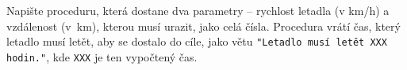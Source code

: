 \question[30]
Napište proceduru, která dostane dva parametry -- rychlost letadla (v km/h) a
vzdálenost (v~km), kterou musí urazit, jako celá čísla. Procedura vrátí čas,
který letadlo musí letět, aby se dostalo do cíle, jako větu \texttt{"Letadlo
musí letět XXX hodin."}, kde \texttt{XXX} je ten vypočtený čas.
